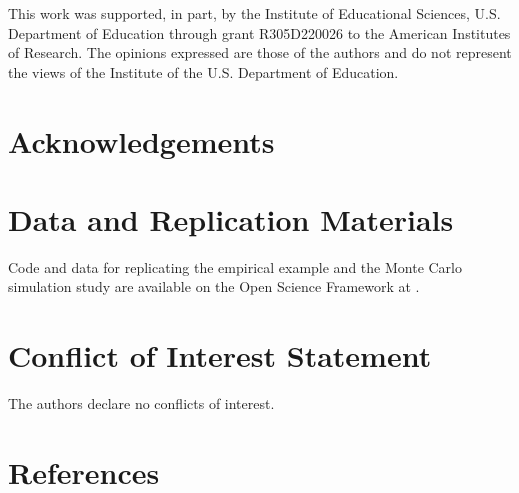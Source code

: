\documentclass[
  american,
  man, donotrepeattitle,floatsintext]{apa7}
\begin{document}
This work was supported, in part, by the Institute of Educational Sciences, U.S. Department of Education through grant R305D220026 to the American Institutes of Research.
The opinions expressed are those of the authors and do not represent the views of the Institute of the U.S. Department of Education.

\section*{Acknowledgements}\label{acknowledgements}

\section*{Data and Replication Materials}\label{data-and-replication-materials}

Code and data for replicating the empirical example and the Monte Carlo simulation study are available on the Open Science Framework at .

\section*{Conflict of Interest Statement}\label{conflict-of-interest-statement}

The authors declare no conflicts of interest.

\section*{References}\label{references}

\begingroup
\end{document}
